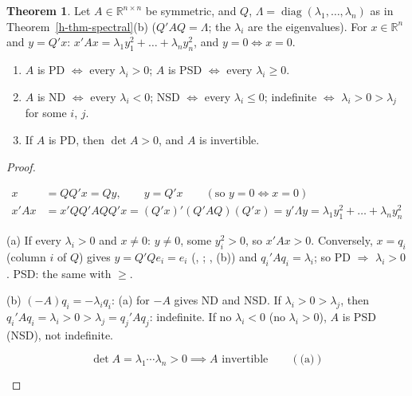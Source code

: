 \documentclass[12pt]{article}
\newcommand{\R}{\mathbb R}
\DeclareMathOperator{\diag}{diag}
\theoremstyle{definition}
\newtheorem{theorem}{Theorem}
\newcommand{\boardtop}{\vspace*{-\abovedisplayskip}}
\begin{document}
\begin{theorem}\label{h-thm-eigen-criterion}
Let \(A\in\R^{n\times n}\) be symmetric, and \(Q\), \(\Lambda=\diag(\lambda_1,\dots,\lambda_n)\) as in
Theorem~\ref{h-thm-spectral}(b) (\(Q'AQ=\Lambda\); the \(\lambda_i\) are the eigenvalues). For \(x\in\R^n\) and
\(y=Q'x\): \(x'Ax=\lambda_1y_1^2+\dots+\lambda_ny_n^2\), and \(y=0\iff x=0\).
\begin{enumerate}
\item \(A\) is PD \(\iff\) every \(\lambda_i>0\); \(A\) is PSD \(\iff\) every \(\lambda_i\geqslant0\).
\item \(A\) is ND \(\iff\) every \(\lambda_i<0\); NSD \(\iff\) every \(\lambda_i\leqslant0\); indefinite \(\iff\)
\(\lambda_i>0>\lambda_j\) for some \(i\), \(j\).
\item If \(A\) is PD, then \(\det A>0\), and \(A\) is invertible.
\end{enumerate}
\end{theorem}
\begin{proof}
\begin{board}[The identity (\(QQ'=I\), \lec{6}, \lit{Theorem~9}(b); \lec{1}, \lit{Theorems~3}(a), \lit{8}):]
\boardtop
\begin{align*}
x&=QQ'x=Qy,\qquad y=Q'x\qquad(\text{so }y=0\iff x=0)\\
x'Ax&=x'QQ'AQQ'x=(Q'x)'(Q'AQ)(Q'x)=y'\Lambda y=\lambda_1y_1^2+\dots+\lambda_ny_n^2
\end{align*}
\end{board}
(a) If every \(\lambda_i>0\) and \(x\ne0\): \(y\ne0\), some \(y_i^2>0\), so \(x'Ax>0\). Conversely, \(x=q_i\) (column
\(i\) of \(Q\)) gives \(y=Q'Qe_i=e_i\) (, ; , (b)) and \(q_i'Aq_i=\lambda_i\); so PD \(\Rightarrow\)
\(\lambda_i>0\). PSD: the same with \(\geqslant\).

(b) \((-A)q_i=-\lambda_iq_i\): (a) for \(-A\) gives ND and NSD. If \(\lambda_i>0>\lambda_j\), then
\(q_i'Aq_i=\lambda_i>0>\lambda_j=q_j'Aq_j\): indefinite. If no \(\lambda_i<0\) (no \(\lambda_i>0\)), \(A\) is PSD (NSD),
not indefinite.
\begin{board}[(c) \(\det A=\lambda_1\cdots\lambda_n\) (\lec{7}, \lit{Theorem~9}); invertible \(\iff\det A\ne0\) (\lec{5},
\lit{Theorem~12}(a)):]
\[
\det A=\lambda_1\cdots\lambda_n>0\implies A\text{ invertible}\qquad(\text{(a)})
\]
\end{board}
\nopagebreak
\end{proof}
\end{document}
